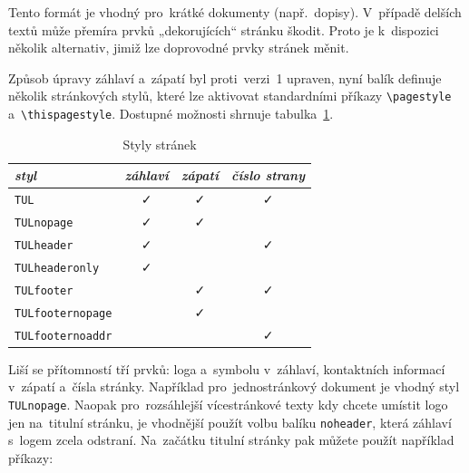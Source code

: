 \documentclass[a4paper,12pt,fonts,numbering,listingsleft]{./tulpackage/tularticle}
\newcommand{\cmdfont}[1]{\texttt{\color{\tulcolor}#1}}
\begin{document}
Tento formát je vhodný pro~krátké dokumenty (např.~dopisy). V~případě delších
textů může přemíra prvků „dekorujících“ stránku škodit. Proto je k~dispozici
několik alternativ, jimiž lze doprovodné prvky stránek měnit.

Způsob úpravy záhlaví a~zápatí byl proti~verzi~1 upraven, nyní balík definuje
několik stránkových stylů, které lze aktivovat standardními příkazy
\cmdfont{\textbackslash{}pagestyle} a~\cmdfont{\textbackslash{}thispagestyle}.
Dostupné možnosti shrnuje tabulka~\ref{styly-stranek}.

\begin{table}[htp]
    \vspace{0.5\baselineskip}
    \caption{Styly stránek}\label{styly-stranek}
    \newcommand{\ano}{\mbox{}\qquad ✓\qquad\mbox{}}
    \begin{tabular}{l@{}c@{}c@{}c}
        \toprule
        \emph{styl}                   & \emph{záhlaví} & \emph{zápatí} & \emph{číslo strany} \\
        \midrule
        \cmdfont{TUL}                 & \ano{}         & \ano{}        & \ano{}              \\
        \cmdfont{TULnopage}           & \ano{}         & \ano{}        &                     \\
        \cmdfont{TULheader}           & \ano{}         &               & \ano{}              \\
        \cmdfont{TULheaderonly}       & \ano{}         &               &                     \\
        \cmdfont{TULfooter}           &                & \ano{}        & \ano{}              \\
        \cmdfont{TULfooternopage}     &                & \ano{}        &                     \\
        \cmdfont{TULfooternoaddr}     &                &               & \ano{}              \\
        \bottomrule
    \end{tabular}
    \vspace{0.5\baselineskip}
\end{table}

Liší se přítomností tří prvků: loga a~symbolu v~záhlaví, kontaktních informací
v~zápatí a~čísla stránky. Například pro~jednostránkový dokument je vhodný styl
\cmdfont{TULnopage}. Naopak pro~rozsáhlejší vícestránkové texty kdy chcete
umístit logo jen na~titulní stránku, je vhodnější použít volbu balíku
\cmdfont{noheader}, která záhlaví s~logem zcela odstraní. Na~začátku titulní
stránky pak můžete použít například příkazy:
\end{document}
